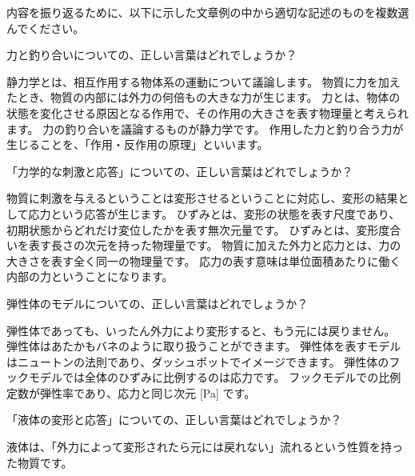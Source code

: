\documentclass[uplatex,dvipdfmx,a4paper,11pt]{jsreport}
\begin{document}
    \newpage


    内容を振り返るために、以下に示した文章例の中から適切な記述のものを複数選んでください。
        \begin{qlist}
            \qitem 力と釣り合いについての、正しい言葉はどれでしょうか？
            \begin{qlist2}
                \qitem 静力学とは、相互作用する物体系の運動について議論します。
                \qitem 物質に力を加えたとき、物質の内部には外力の何倍もの大きな力が生じます。
                \qitem 力とは、物体の状態を変化させる原因となる作用で、その作用の大きさを表す物理量と考えられます。
                \qitem 力の釣り合いを議論するものが静力学です。
                \qitem 作用した力と釣り合う力が生じることを、「作用・反作用の原理」といいます。
            \end{qlist2}
        \vspace{3mm}
        \qitem 「力学的な刺激と応答」についての、正しい言葉はどれでしょうか？
            \begin{qlist2}
                \qitem 物質に刺激を与えるということは変形させるということに対応し、変形の結果として応力という応答が生じます。
                \qitem ひずみとは、変形の状態を表す尺度であり、初期状態からどれだけ変位したかを表す無次元量です。
                \qitem ひずみとは、変形度合いを表す長さの次元を持った物理量です。
                \qitem 物質に加えた外力と応力とは、力の大きさを表す全く同一の物理量です。
                \qitem 応力の表す意味は単位面積あたりに働く内部の力ということになります。
            \end{qlist2}
        \vspace{3mm}
        \qitem 弾性体のモデルについての、正しい言葉はどれでしょうか？
            \begin{qlist2}
                \qitem 弾性体であっても、いったん外力により変形すると、もう元には戻りません。
                \qitem 弾性体はあたかもバネのように取り扱うことができます。
                \qitem 弾性体を表すモデルはニュートンの法則であり、ダッシュポットでイメージできます。
                \qitem 弾性体のフックモデルでは全体のひずみに比例するのは応力です。
                \qitem フックモデルでの比例定数が弾性率であり、応力と同じ次元 [Pa] です。
            \end{qlist2}
        \vspace{3mm}
        \qitem 「液体の変形と応答」についての、正しい言葉はどれでしょうか？
        \begin{qlist2}
            \qitem 液体は、「外力によって変形されたら元には戻れない」流れるという性質を持った物質です。

\end{qlist2}
\end{qlist}
\end{document}
